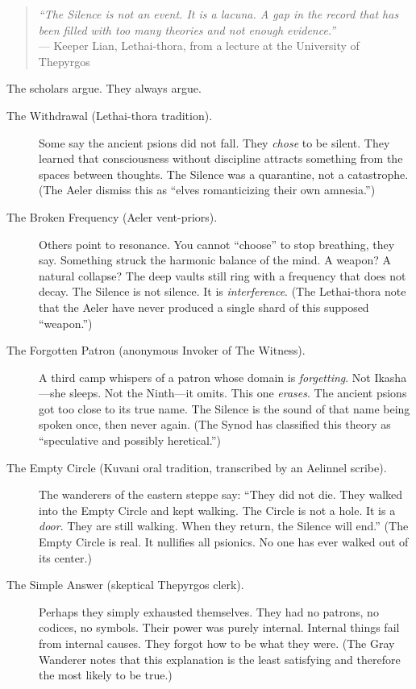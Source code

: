 \documentclass[11pt,twoside]{article}
\begin{document}
\begin{quote}
\emph{``The Silence is not an event. It is a lacuna. A gap in the record that has been filled with too many theories and not enough evidence.''} \\
--- Keeper Lian, Lethai-thora, from a lecture at the University of Thepyrgos
\end{quote}

The scholars argue. They always argue.

\begin{description}
  \item[The Withdrawal (Lethai-thora tradition).] Some say the ancient psions did not fall. They \textit{chose} to be silent. They learned that consciousness without discipline attracts something from the spaces between thoughts. The Silence was a quarantine, not a catastrophe. (The Aeler dismiss this as ``elves romanticizing their own amnesia.'')

  \item[The Broken Frequency (Aeler vent-priors).] Others point to resonance. You cannot ``choose'' to stop breathing, they say. Something struck the harmonic balance of the mind. A weapon? A natural collapse? The deep vaults still ring with a frequency that does not decay. The Silence is not silence. It is \textit{interference}. (The Lethai-thora note that the Aeler have never produced a single shard of this supposed ``weapon.'')

  \item[The Forgotten Patron (anonymous Invoker of The Witness).] A third camp whispers of a patron whose domain is \textit{forgetting}. Not Ikasha---she sleeps. Not the Ninth---it omits. This one \textit{erases}. The ancient psions got too close to its true name. The Silence is the sound of that name being spoken once, then never again. (The Synod has classified this theory as ``speculative and possibly heretical.'')

  \item[The Empty Circle (Kuvani oral tradition, transcribed by an Aelinnel scribe).] The wanderers of the eastern steppe say: ``They did not die. They walked into the Empty Circle and kept walking. The Circle is not a hole. It is a \textit{door}. They are still walking. When they return, the Silence will end.'' (The Empty Circle is real. It nullifies all psionics. No one has ever walked out of its center.)

  \item[The Simple Answer (skeptical Thepyrgos clerk).] Perhaps they simply exhausted themselves. They had no patrons, no codices, no symbols. Their power was purely internal. Internal things fail from internal causes. They forgot how to be what they were. (The Gray Wanderer notes that this explanation is the least satisfying and therefore the most likely to be true.)
\end{description}
\end{document}
